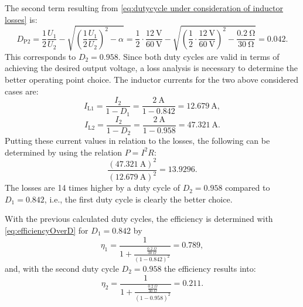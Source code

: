 \begin{solutionblock}
	The second term resulting from \eqref{eq:dutycycle under consideration of inductor losses} is:
	\begin{equation}
		D_\mathrm{P2}=\frac{1}{2}\frac{U_\mathrm{1}}{U_\mathrm{2}}-\sqrt{\left(\frac{1}{2}\frac{U_\mathrm{1}}{U_\mathrm{2}}\right)^2-\alpha}= \frac{1}{2}\cdot\frac{\SI{12}{\volt}}{\SI{60}{\volt}}-\sqrt{\left({\frac{1}{2}}\cdot\frac{\SI{12}{\volt}}{\SI{60}{\volt}}\right)^2-\frac{\SI{0.2}{\ohm}}{\SI{30}{\ohm}}}= 0.042.
	\end{equation}
	This corresponds to $D_\mathrm{2}=0.958$. Since both duty cycles are valid in terms of achieving the desired output voltage, a loss analysis is necessary to determine the better operating point choice. The inductor currents for the two above considered cases are:
	\begin{equation}
		I_\mathrm{L1} = \frac{I_\mathrm{2}}{1-D_\mathrm{1}}= \frac{\SI{2}{\ampere}}{1-0.842}=\SI{12.679}{\ampere},
	\end{equation}
	\begin{equation}
		I_\mathrm{L2} = \frac{I_\mathrm{2}}{1-D_\mathrm{2}}= \frac{\SI{2}{\ampere}}{1-0.958}=\SI{47.321}{\ampere}.
	\end{equation}
	Putting these current values in relation to the losses, the following can be determined by using the relation $P=I^2R$:
	\begin{equation}
		\frac{(\SI{47.321}{\ampere})^2}{(\SI{12.679}{\ampere})^2}=13.9296.
	\end{equation}
	The losses are 14 times higher by a duty cycle of $D_\mathrm{2}=0.958$ compared to $D_\mathrm{1}=0.842$, i.e., the first duty cycle is clearly the better choice.
\end{solutionblock}


\begin{solutionblock}
	With the previous calculated duty cycles, the efficiency is determined with \eqref{eq:efficiencyOverD} for $D_{\mathrm{1}} = 0.842$ by
	\begin{equation}
		\eta_{\mathrm{1}} = \frac{1}{1+\frac{\frac{\SI{0.2}{\Omega}}{\SI{30}{\Omega}}}{\left(1-0.842\right)^2}} = 0.789,
	\end{equation}
	and, with the second duty cycle $D_2 = 0.958$ the efficiency results into:
	\begin{equation}
		\eta_{\mathrm{2}} = \frac{1}{1+\frac{\frac{\SI{0.2}{\Omega}}{\SI{30}{\Omega}}}{\left(1-0.958\right)^2}} = 0.211.
	\end{equation}

\end{solutionblock}

